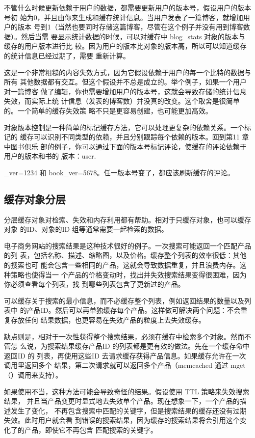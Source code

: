 不管什么时候更新依赖于用户的数据，都需要更新用户的版本号，假设用户的版本号初
始为0，并且由你来生成和缓存统计信息。当用户发表了一篇博客，就增加用户的版本
号到1（当然也要同时存储这篇博客，尽管在这个例子并没有用到博客数据）。然后当需
要显示统计数据的时候，可以对缓存中 blog\_stats 对象的版本与缓存的用户版本进行比
较。因为用户的版本比对象的版本高，所以可以知道缓存的统计信息已经过期了，需要
重新计算。

这是一个非常粗糙的内容失效方式，因为它假设依赖于用户的每一个比特的数据与所有
其他数据都有交互。但这个假设并不总是成立的。举个例子，如果一个用户对一篇博客
做了编辑，你也需要增加用户的版本号，这就会导致存储的统计信息失效，而实际上统
计信息（发表的博客数）并没真的改变。这个取舍是很简单的。一个简单的缓存失效策
略不只是更容易创建，也可能更加高效。

对象版本控制是一种简单的标记缓存方法，它可以处理更复杂的依赖关系。一个标记的
缓存可以识别不同类型的依赖，并且分别跟踪每个依赖的版本。回到第11 章中图书俱乐
部的例子，你可以通过下面的版本号标记评论，使缓存的评论依赖于用户的版本和书的
版本：user.

\_ver=1234 和 book\_ver=5678。任一版本号变了，都应该刷新缓存的评论。

\subsection{缓存对象分层}
分层缓存对象对检索、失效和内存利用都有帮助。相对于只缓存对象，也可以缓存对象
的ID、对象的ID 组等通常需要一起检索的数据。

电子商务网站的搜索结果是这种技术很好的例子。一次搜索可能返回一个匹配产品的列
表，包括名称、描述、缩略图，以及价格。缓存整个列表的效率很低：其他的搜索也可
能会包含一些相同的产品，这就会导致数据重复，并且浪费内存。这种策略也使得当一
个产品的价格变动时，找出并失效搜索结果变得很困难，因为你必须查看每个列表，找
到哪些列表包含了更新过的产品。

可以缓存关于搜索的最小信息，而不必缓存整个列表，例如返回结果的数量以及列表中
的产品ID。然后可以再单独缓存每个产品。这样做可解决两个问题：不会重复存放任何
结果数据，也更容易在失效产品的粒度上去失效缓存。

缺点则是，相对于一次性获得整个搜索结果，必须在缓存中检索多个对象。然而不管怎
么说，为搜索结果缓存产品ID 的列表都是更有效的做法。先在一个缓存命中返回ID 的
列表，再使用这些ID 去请求缓存获得产品信息。如果缓存允许在一次调用里返回多个
结果，第二次请求就可以返回多个产品（memcached 通过 mget（）调用来支持）。

如果使用不当，这种方法可能会导致奇怪的结果。假设使用 TTL 策略来失效搜索结果，
并且当产品变更时显式地去失效单个产品。现在想象一下，一个产品的描述发生了变化，
不再包含搜索中匹配的关键字，但是搜索结果的缓存还没有过期失效。此时用户就会看
到错误的搜索结果，因为缓存的搜索结果将会引用这个变化了的产品，即使它不再包含
匹配搜索的关键字。

